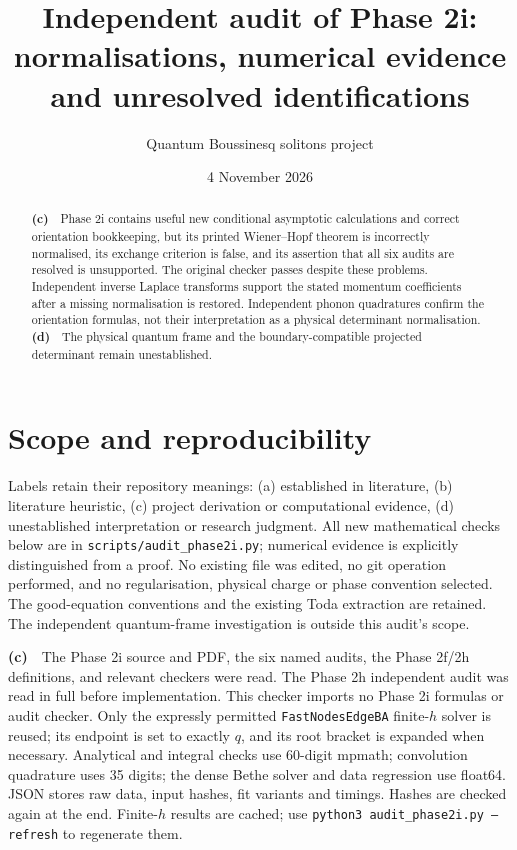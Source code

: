 \documentclass[11pt,a4paper]{article}
\title{Independent audit of Phase 2i:\\normalisations, numerical evidence and unresolved identifications}
\author{Quantum Boussinesq solitons project}
\date{4 November 2026}
\newcommand{\Lc}{\textbf{(c)}\ }
\newcommand{\Ld}{\textbf{(d)}\ }
\newcommand{\scr}{\texttt{audit\_\allowbreak phase2i.py}}
\begin{document}
\maketitle
\begin{abstract}
\Lc\ Phase 2i contains useful new conditional asymptotic calculations and correct
orientation bookkeeping, but its printed Wiener--Hopf theorem is incorrectly
normalised, its exchange criterion is false, and its assertion that all six
audits are resolved is unsupported. The original checker passes despite these
problems. Independent inverse Laplace transforms support the stated momentum
coefficients after a missing normalisation is restored. Independent phonon
quadratures confirm the orientation formulas, not their interpretation as a
physical determinant normalisation. \Ld\ The physical quantum frame and the
boundary-compatible projected determinant remain unestablished.
\end{abstract}

\section{Scope and reproducibility}
Labels retain their repository meanings: (a) established in literature, (b)
literature heuristic, (c) project derivation or computational evidence, (d)
unestablished interpretation or research judgment. All new mathematical checks
below are in \texttt{scripts/}\scr; numerical evidence is explicitly distinguished
from a proof. No existing file was edited, no git operation performed, and no
regularisation, physical charge or phase convention selected. The good-equation
conventions and the existing Toda extraction are retained. The independent
quantum-frame investigation is outside this audit's scope.

\Lc\ The Phase 2i source and PDF, the six named audits, the Phase 2f/2h definitions,
and relevant checkers were read. The Phase 2h independent audit was read in full
before implementation. This checker imports no Phase 2i formulas or audit
checker. Only the expressly permitted \texttt{FastNodesEdgeBA} finite-$h$ solver
is reused; its endpoint is set to exactly $q$, and its root bracket is expanded
when necessary. Analytical and integral checks use 60-digit mpmath; convolution
quadrature uses 35 digits; the dense Bethe solver and data regression use
float64. JSON stores raw data, input hashes, fit variants and timings. Hashes
are checked again at the end. Finite-$h$ results are cached; use
\texttt{python3 audit\_phase2i.py --refresh} to regenerate them.
\end{document}
